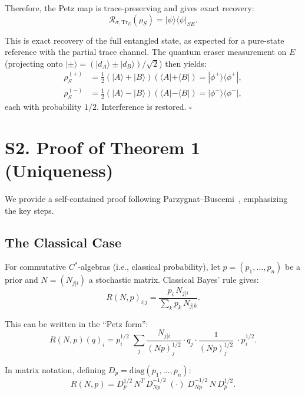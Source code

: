 \documentclass[prl,twocolumn,superscriptaddress,longbibliography]{revtex4-2}
\newcommand{\Tr}{\mathrm{Tr}}
\newcommand{\Petz}{\mathcal{R}}
\newcommand{\ket}[1]{|#1\rangle}
\newcommand{\bra}[1]{\langle#1|}
\begin{document}
Therefore, the Petz map is trace-preserving and gives exact recovery:
\begin{equation}
\Petz_{\sigma,\Tr_E}(\rho_S) = \ket{\psi}\bra{\psi}_{SE}.
\end{equation}

This is exact recovery of the full entangled state, as expected for a
pure-state reference with the partial trace channel. The quantum eraser
measurement on $E$ (projecting onto
$\ket{\pm} = (\ket{d_A} \pm \ket{d_B})/\sqrt{2}$) then yields:
\begin{align}
\rho_S^{(+)} &= \tfrac{1}{2}(\ket{A}+\ket{B})(\bra{A}+\bra{B})
= \ket{\phi^+}\bra{\phi^+}, \\
\rho_S^{(-)} &= \tfrac{1}{2}(\ket{A}-\ket{B})(\bra{A}-\bra{B})
= \ket{\phi^-}\bra{\phi^-},
\end{align}
each with probability $1/2$. Interference is restored. \hfill$\square$

\section{S2. Proof of Theorem 1 (Uniqueness)}
\label{sec:proof_theorem1}

We provide a self-contained proof following
Parzygnat--Buscemi~\cite{Parzygnat2023}, emphasizing the key steps.

\subsection{The Classical Case}

For commutative $C^*$-algebras (i.e., classical probability), let
$p = (p_1, \ldots, p_n)$ be a prior and $N = (N_{j|i})$ a stochastic
matrix. Classical Bayes' rule gives:
\begin{equation}
R(N,p)_{i|j} = \frac{p_i\, N_{j|i}}{\sum_k p_k\, N_{j|k}}.
\label{eq:bayes}
\end{equation}

This can be written in the ``Petz form'':
\begin{equation}
R(N,p)(q)_i = p_i^{1/2}\;\sum_j \frac{N_{j|i}}{(Np)_j^{1/2}}
\cdot q_j \cdot \frac{1}{(Np)_j^{1/2}} \;\cdot p_i^{1/2}.
\end{equation}

In matrix notation, defining $D_p = \mathrm{diag}(p_1,\ldots,p_n)$:
\begin{equation}
R(N,p) = D_p^{1/2}\, N^T\, D_{Np}^{-1/2}\;(\cdot)\; D_{Np}^{-1/2}\,
N\, D_p^{1/2}.
\end{equation}
\end{document}
